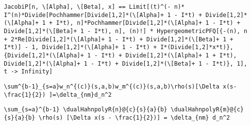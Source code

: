 \newsavebox\CVMM
\begin{lrbox}{\CVMM}
 \begin{minipage}[t]{0.82\textwidth}
  \lstinline[language={[latex]TeX},mathescape,breaklines=true]"JacobiP[n, \[Alpha], \[Beta], x] == Limit[(t)^(- n)* I^(n)*Divide[Pochhammer[Divide[1,2]*(\[Alpha]+ 1 - I*t) + Divide[1,2]*(\[Alpha]+ 1 + I*t), n]*Pochhammer[Divide[1,2]*(\[Alpha]+ 1 - I*t) + Divide[1,2]*(\[Beta]+ 1 - I*t), n], (n)!] * HypergeometricPFQ[{-(n), n + 2*Re[Divide[1,2]*(\[Alpha]+ 1 - I*t) + Divide[1,2]*(\[Beta]+ 1 + I*t)] - 1, Divide[1,2]*(\[Alpha]+ 1 - I*t) + I*(Divide[1,2]*x*t)}, {Divide[1,2]*(\[Alpha]+ 1 - I*t) + Divide[1,2]*(\[Alpha]+ 1 + I*t), Divide[1,2]*(\[Alpha]+ 1 - I*t) + Divide[1,2]*(\[Beta]+ 1 - I*t)}, 1], t -> Infinity]"
 \end{minipage}
\end{lrbox}
\newsavebox\CVMA
\begin{lrbox}{\CVMA}
 \begin{minipage}[t]{0.82\textwidth}
  \lstinline[language={[latex]TeX},mathescape,breaklines=true]""
 \end{minipage}
\end{lrbox}
\newsavebox\CWT
\begin{lrbox}{\CWT}
 \begin{minipage}[t]{0.82\textwidth}
  \lstinline[language={[latex]TeX},mathescape,breaklines=true]"\sum^{b-1}_{s=a}w_n^{(c)}(s,a,b)w_m^{(c)}(s,a,b)\rho(s)[\Delta x(s-\frac{1}{2}) ]=\delta_{nm}d_n^2"
 \end{minipage}
\end{lrbox}
\newsavebox\CWST
\begin{lrbox}{\CWST}
 \begin{minipage}[t]{0.82\textwidth}
  \lstinline[language={[latex]TeX},mathescape,breaklines=true]"\sum_{s=a}^{b-1} \dualHahnpolyR{n}@{c}{s}{a}{b} \dualHahnpolyR{m}@{c}{s}{a}{b} \rho(s) [\Delta x(s - \frac{1}{2})] = \delta_{nm} d_n^2"
 \end{minipage}
\end{lrbox}
\newsavebox\CWMM
\begin{lrbox}{\CWMM}
 \begin{minipage}[t]{0.82\textwidth}
  \lstinline[language={[latex]TeX},mathescape,breaklines=true]""
 \end{minipage}
\end{lrbox}
\newsavebox\CWMA
\begin{lrbox}{\CWMA}
 \begin{minipage}[t]{0.82\textwidth}
  \lstinline[language={[latex]TeX},mathescape,breaklines=true]""
 \end{minipage}
\end{lrbox}
